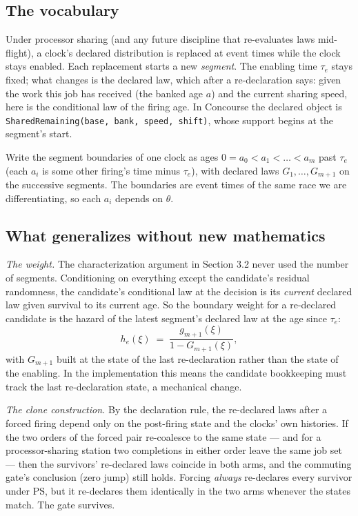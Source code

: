 \documentclass[11pt]{article}
\newcommand{\code}[1]{\texttt{#1}}
\begin{document}
\subsection{The vocabulary}

Under processor sharing (and any future discipline that re-evaluates
laws mid-flight), a clock's declared distribution is replaced at event
times while the clock stays enabled. Each replacement starts a new
\emph{segment}. The enabling time $\tau_e$ stays fixed; what changes is
the declared law, which after a re-declaration says: given the work this
job has received (the banked age $a$) and the current sharing speed, here
is the conditional law of the firing age. In Concourse the declared
object is \code{SharedRemaining(base, bank, speed, shift)}, whose support
begins at the segment's start.

Write the segment boundaries of one clock as ages
$0 = a_0 < a_1 < \dots < a_{m}$ past $\tau_e$ (each $a_i$ is some other
firing's time minus $\tau_e$), with declared laws $G_1, \dots, G_{m+1}$
on the successive segments. The boundaries are event times of the same
race we are differentiating, so each $a_i$ depends on $\theta$.

\subsection{What generalizes without new mathematics}

\emph{The weight.} The characterization argument in Section 3.2 never
used the number of segments. Conditioning on everything except the
candidate's residual randomness, the candidate's conditional law at the
decision is its \emph{current} declared law given survival to its current
age. So the boundary weight for a re-declared candidate is the hazard of
the latest segment's declared law at the age since $\tau_e$:
\[
h_e(\xi) \;=\; \frac{g_{m+1}(\xi)}{1 - G_{m+1}(\xi)} ,
\]
with $G_{m+1}$ built at the state of the last re-declaration rather than
the state of the enabling. In the implementation this means the
candidate bookkeeping must track the last re-declaration state, a
mechanical change.

\emph{The clone construction.} By the declaration rule, the re-declared
laws after a forced firing depend only on the post-firing state and the
clocks' own histories. If the two orders of the forced pair re-coalesce
to the same state --- and for a processor-sharing station two completions
in either order leave the same job set --- then the survivors'
re-declared laws coincide in both arms, and the commuting gate's
conclusion (zero jump) still holds. Forcing \emph{always} re-declares
every survivor under PS, but it re-declares them identically in the two
arms whenever the states match. The gate survives.
\end{document}
